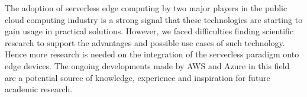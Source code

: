 \documentclass[article]{aaltoseries}
\begin{document}
The adoption of serverless edge computing by two major players in the public cloud computing industry is a strong signal that these technologies are starting to gain usage in practical solutions.
However, we faced difficulties finding scientific research to support the advantages and possible use cases of such technology.
Hence more research is needed on the integration of the serverless paradigm onto edge devices.
The ongoing developments made by AWS and Azure in this field are a potential source of knowledge, experience and inspiration for future academic research.

\newpage


\end{document}
